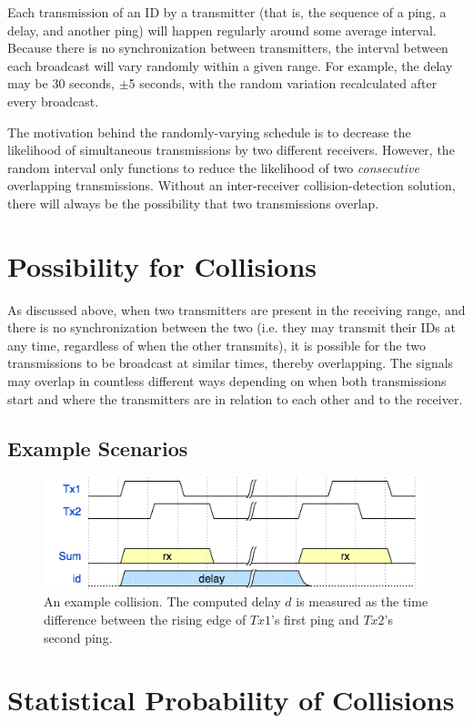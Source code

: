 \documentclass[12pt]{article}
\begin{document}
Each transmission of an ID by a transmitter (that is, the sequence of a
ping, a delay, and another ping) will happen regularly around some average
interval.
Because there is no synchronization between transmitters, the interval
between each broadcast will vary randomly within a given range.
For example, the delay may be 30 seconds, $\pm$5 seconds, with the random
variation recalculated after every broadcast.

The motivation behind the randomly-varying schedule is to decrease the
likelihood of simultaneous transmissions by two different receivers.
However, the random interval only functions to reduce the likelihood of
two \emph{consecutive} overlapping transmissions.
Without an inter-receiver collision-detection solution, there will always
be the possibility that two transmissions overlap.

\section{Possibility for Collisions}

As discussed above,
when two transmitters are present in the receiving range, and there is no
synchronization between the two (i.e. they may transmit their IDs at any
time, regardless of when the other transmits), it is possible for the two
transmissions to be broadcast at similar times, thereby overlapping.
The signals may overlap in countless different ways depending on when
both transmissions start and where the transmitters are in relation to
each other and to the receiver.

\subsection{Example Scenarios}

\begin{figure}[h]
	\centering
		\includegraphics[scale=0.7]{collision1}
		
		\caption{An example collision. The computed delay $d$ is
		measured as the time difference between the rising edge of
		$Tx1$'s first ping and $Tx2$'s second ping.}
\end{figure}


\section{Statistical Probability of Collisions}
\end{document}
